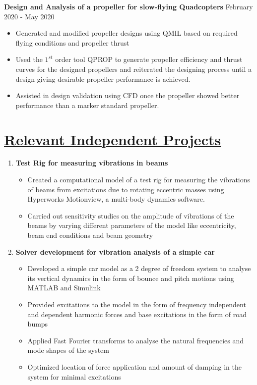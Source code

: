 \documentclass{article}
\def\majordateprop{\large{February 2020 - May 2020}}
\begin{document}
\large{\textbf{Design and Analysis of a propeller for slow-flying Quadcopters}}
\hspace{0.65 in}
\majordateprop
\begin{itemize}
\item\large{Generated and modified propeller designs using QMIL based on required flying conditions and propeller thrust}
\item\large{Used the $1^{st}$ order tool QPROP to generate propeller efficiency and thrust curves for the designed propellers and reiterated the designing process until a design giving desirable propeller performance is achieved.}
\item\large{Assisted in design validation using CFD once the propeller showed better performance than a marker standard propeller.}
\end{itemize}
\section{\underline{Relevant Independent Projects}}
\begin{enumerate}
\item\large{\textbf{Test Rig for measuring vibrations in beams}}
\begin{itemize}
\item\large{Created a computational model of a test rig for measuring the vibrations of beams from excitations due to rotating eccentric masses using Hyperworks Motionview, a multi-body dynamics software.}
\item\large{Carried out sensitivity studies on the amplitude of vibrations of the beams by varying different parameters of the model like eccentricity, beam end conditions and beam geometry}
\end{itemize}
\item\large\textbf{{Solver development for vibration analysis of a simple car}}
\begin{itemize}
\item\large{Developed a simple car model as a 2 degree of freedom system to analyse its vertical dynamics in the form of bounce and pitch motions using MATLAB and Simulink}
\item\large{Provided excitations to the model in the form of frequency independent and dependent harmonic forces and base excitations in the form of road bumps}
\item\large{Applied Fast Fourier transforms to analyse the natural frequencies and mode shapes of the system}
\item\large{Optimized location of force application and amount of damping in the system for minimal excitations}
\end{itemize}
\end{enumerate}
\end{document}
